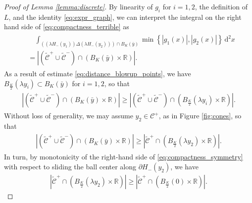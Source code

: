 \documentclass[11pt]{article}
\numberwithin{statement}{section}
\numberwithin{equation}{section}
\theoremstyle{remark}
\newcommand{\R}{\mathbb R} 				%
\newcommand{\intd}{\, \mathrm{d}} 				%
\begin{document}
\begin{proof}[Proof of Lemma \ref{lemma:discrete}]
	By linearity of $g_i$ for $i=1,2$, the definition of $L$, and
        the identity \eqref{eq:expr_graph}, we can interpret the
        integral on the right hand side of
        \eqref{eq:compactness_terrible} as
	\begin{align}\label{eq:compactness_geometry}
	  \begin{split}
            & \quad \int_{\left( (\lambda H_-\left(y_1 \right) )
                \Delta (\lambda H_-(y_2) ) \right) \cap B_{
                K}(\bar
              y)}  \min\left\{|g_1(x)|,|g_2(x)| \right\} \intd^2 x \\
            &= \left|\left(\mathcal{\tilde C}^+ \cup \mathcal{\tilde
                  C}^-\right) \cap \left( B_{ K}(\bar y) \times \R
              \right) \right|.
	  \end{split}
	\end{align}
	As a result of estimate \eqref{eq:distance_blowup_points}, we
        have $B_{\frac{K}{2}}(\lambda y_i) \subset B_{ K}(\bar y)$ for
        $i=1,2$, so that
	\begin{align}
	  \begin{split}
            \left|\left(\mathcal{\tilde C}^+ \cup \mathcal{\tilde
                  C}^-\right) \cap \left( B_{ K}(\bar y) \times
                \R \right) \right| \geq 
              \left|\left(\mathcal{\tilde C}^+ \cup \mathcal{\tilde
                    C}^-\right) \cap \left( B_{ \frac{K}{2}}(\lambda y_i)
                  \times \R \right) \right|.
	  \end{split}
	\end{align}
	Without loss of generality, we may assume
          $y_2 \in \mathcal{C}^+$, as in Figure \ref{fig:cones}, so
        that
	\begin{align}\label{eq:compactness_symmetry}
	  \begin{split}
            \left|\left(\mathcal{\tilde C}^+ \cup \mathcal{\tilde
                  C}^-\right) \cap \left( B_{ K}(\bar y) \times \R
              \right) \right| \geq  \left|\mathcal{\tilde C}^+
                \cap \left( B_{ \frac{K}{2}}(\lambda y_2) \times \R \right)
              \right|.
	  \end{split}
	\end{align}
	In turn, by monotonicity of the right-hand side of
        \eqref{eq:compactness_symmetry} with respect to sliding the
        ball center along $\partial H_-(y_2)$, we have
	\begin{align}
          \left|\mathcal{\tilde C}^+
          \cap \left( B_{ \frac{K}{2}}(\lambda y_2) \times \R \right)
          \right| \geq \left|\mathcal{\tilde C}^+
          \cap \left( B_{ \frac{K}{2}}(0) \times \R \right)
          \right| .
	\end{align}
      

\end{proof}
\end{document}

